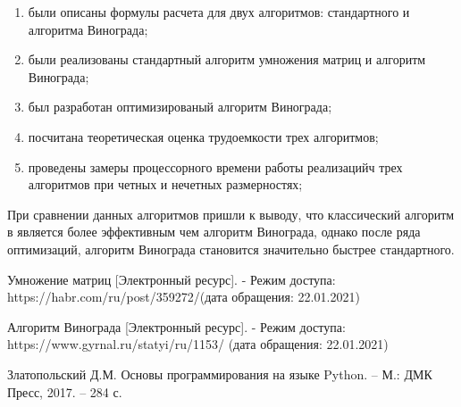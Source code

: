 \documentclass[a4paper,12pt]{article}
\begin{document}
	\begin{enumerate}
		\item были описаны формулы расчета для двух алгоритмов: стандартного и алгоритма Винограда; 
		\item были реализованы стандартный алгоритм умножения матриц и алгоритм Винограда;
		\item был разработан оптимизированый алгоритм Винограда;
		\item посчитана теоретическая оценка трудоемкости трех алгоритмов;
		\item проведены замеры процессорного времени работы реализацийч трех алгоритмов при четных и нечетных размерностях;
	\end{enumerate}

	При сравнении данных алгоритмов пришли к выводу, что классический алгоритм в является более эффективным чем алгоритм Винограда, однако после ряда оптимизаций, алгоритм Винограда становится значительно быстрее стандартного.
	
	\newpage
	 \begin{thebibliography}{}
		
		\bibitem{} Умножение матриц [Электронный ресурс]. - Режим доступа: https://habr.com/ru/post/359272/(дата обращения: 22.01.2021)
		
		\bibitem{} Алгоритм Винограда [Электронный ресурс]. - Режим доступа: https://www.gyrnal.ru/statyi/ru/1153/ (дата обращения: 22.01.2021)
		
		\bibitem{} Златопольский Д.М. Основы программирования на языке Python. – М.: ДМК Пресс, 2017. – 284 с.
	\end{thebibliography} 
	
\end{document}
